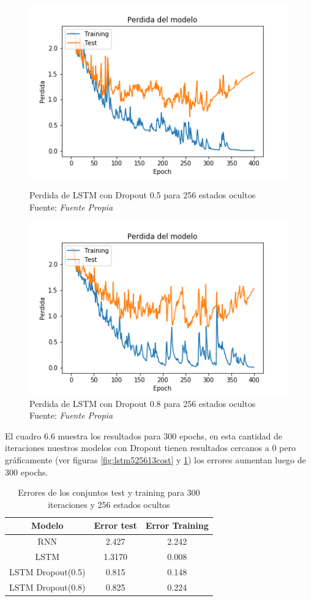 \begin{figure}[H]
	\centering
	\includegraphics[width=0.7\linewidth]{Figures/lstm5_256_13cost}
	\caption{Perdida de LSTM con Dropout 0.5 para 256 estados ocultos\\ Fuente: {\textit{Fuente Propia}}}
	\label{fig:lstm525613cost}
	
	\centering
	\includegraphics[width=0.7\linewidth]{Figures/lstm_256_13cost}
	\caption{Perdida de LSTM con Dropout 0.8 para 256 estados ocultos\\ Fuente: {\textit{Fuente Propia}}}
	\label{fig:lstm25613cost}
\end{figure}
El cuadro 6.6 muestra los resultados para 300 epochs, en esta cantidad de iteraciones nuestros modelos con Dropout tienen resultados cercanos a 0 pero gráficamente (ver figuras \ref{fig:lstm525613cost} y \ref{fig:lstm25613cost}) los errores aumentan luego de 300 epochs.


\begin{table}[H]
	\centering
	\begin{tabular}{|c|c|c|}
		\hline
		\rowcolor{Gray}  Modelo & Error test& Error Training \\ \hline
		RNN &        2.427 &             2.242     \\ \hline
		LSTM &        1.3170  &          0.008    \\ \hline
		LSTM Dropout(0.5) &  0.815       &     0.148        \\ \hline
		LSTM Dropout(0.8) &	0.825		&	0.224	\\ \hline
	\end{tabular}
	\caption{Errores de los conjuntos test y training para 300 iteraciones y 256 estados ocultos}
\end{table}

